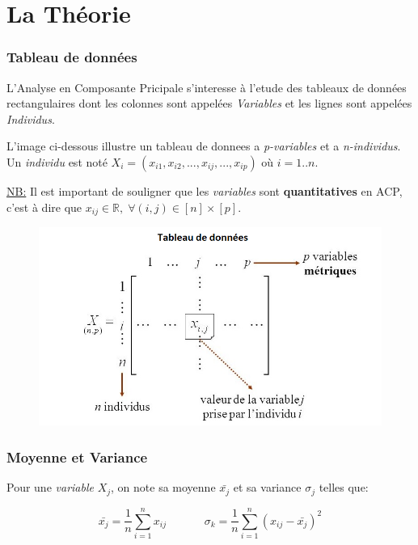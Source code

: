 \documentclass{article}
\begin{document}
\section{La Théorie}

\subsubsection{Tableau de données}

L'Analyse en Composante Pricipale s'interesse à l'etude des tableaux de données rectangulaires dont les colonnes sont appelées \textit{Variables} et les lignes sont appelées \textit{Individus}.
\newline

L'image ci-dessous illustre un tableau de donnees a \textit{p-variables} et a \textit{n-individus}. Un \textit{individu} est noté $X_i=(x_{i1},x_{i2}, ... ,x_{ij}, ... ,x_{ip})$ où $i=1..n$.
\newline

\underline{NB:} Il est important de souligner que les \textit{variables} sont \textbf{quantitatives} en ACP, c'est à dire que $x_{ij} \in \mathbb{R}, \; \forall (i,j) \in [n]\times[p].$

\begin{figure}[h!]
\includegraphics[width=\linewidth]{images/tableau.png}
\end{figure}

\subsubsection{Moyenne et Variance}

Pour une \textit{variable} ${X_j}$, on note sa moyenne $\bar{x_j}$ et sa variance $\sigma_j$ telles que:

\begin{equation*}
\bar{x_j}=\frac{1}{n}\sum_{i=1}^{n}{x_{ij}} \;\;\;\;\;\;\;\;\;\;\;\; \sigma_k=\frac{1}{n}\sum_{i=1}^{n}{(x_{ij}-\bar{x_{j}})^2}
\end{equation*}
\end{document}
